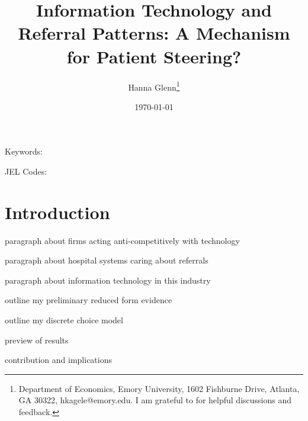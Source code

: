 \documentclass[12pt]{article}
\begin{document}
	
	
	
	
	\linespread{1.2}\title{\vspace{-0.5in} Information Technology and Referral Patterns: A Mechanism for Patient Steering?} 
	
	
	\date{\today}
	
	\author{Hanna Glenn\footnote{Department of Economics, Emory University, 1602 Fishburne Drive, Atlanta, GA 30322, hkagele@emory.edu. I am grateful to for helpful discussions and feedback.} }
	
	\maketitle
	
	\vspace{-0.2in}
	
	\singlespacing\maketitle
	
	\begin{abstract}
		{\small
			
			
		} 
	\end{abstract}
	
	
	
	
	\vspace{0.1in}
	
	\noindent Keywords: 
	
	\noindent JEL Codes: 
	
	\onehalfspacing
	
	\newpage
	
	\onehalfspacing

 \section{Introduction}
	
	paragraph about firms acting anti-competitively with technology

    paragraph about hospital systems caring about referrals

    paragraph about information technology in this industry

    outline my preliminary reduced form evidence

    outline my discrete choice model

    preview of results

    contribution and implications
	
\end{document}
